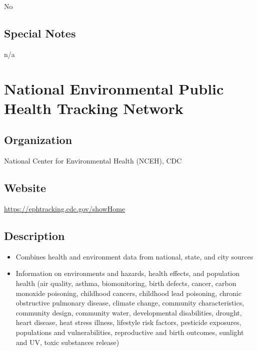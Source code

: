 \documentclass[
]{book}
\providecommand{\tightlist}{%
  \setlength{\itemsep}{0pt}\setlength{\parskip}{0pt}}
\begin{document}
No

\hypertarget{special-notes-47}{%
\section{Special Notes}\label{special-notes-47}}

n/a

\mainmatter

\hypertarget{national-environmental-public-health-tracking-network}{%
\chapter{National Environmental Public Health Tracking Network}\label{national-environmental-public-health-tracking-network}}

\hypertarget{organization-48}{%
\section{Organization}\label{organization-48}}

National Center for Environmental Health (NCEH), CDC

\hypertarget{website-48}{%
\section{Website}\label{website-48}}

\url{https://ephtracking.cdc.gov/showHome}

\hypertarget{description-48}{%
\section{Description}\label{description-48}}

\begin{itemize}
\tightlist
\item
  Combines health and environment data from national, state, and city sources
\item
  Information on environments and hazards, health effects, and population health (air quality, asthma, biomonitoring, birth defects, cancer, carbon monoxide poisoning, childhood cancers, childhood lead poisoning, chronic obstructive pulmonary disease, climate change, community characteristics, community design, community water, developmental disabilities, drought, heart disease, heat stress illness, lifestyle risk factors, pesticide exposures, populations and vulnerabilities, reproductive and birth outcomes, sunlight and UV, toxic substances release)
\end{itemize}
\end{document}

